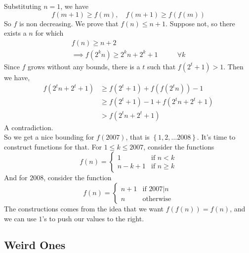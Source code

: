 \begin{solution}
    Substituting $n=1$, we have 
    \[f(m+1) \ge f(m), \quad f(m+1) \ge f(f(m))\]
    So $f$ is non decreasing. We prove that $f(n) \le n+1$. Suppose not, so
    there exists a $n$ for which
    \[\begin{aligned}
        f(n) \ge n+2&\\
        \implies f(2^kn) \ge 2^kn + 2^k +1& \qquad \forall k
    \end{aligned}\] 
    Since $f$ grows without any bounds, there is a $t$ such that $f(2^t+1)>1$.
    Then we have,
    \[\begin{aligned}
        f(2^tn+2^t+1) &\ge f(2^t+1) + f(f(2^tn)) -1\\
                      &\ge f(2^t+1)-1 +f(2^tn+2^t+1)\\
                      &> f(2^tn+2^t+1)
    \end{aligned}\]
    A contradiction.\\

    So we get a nice bounding for $f(2007)$, that is $\left\{1, 2, \dots
    2008\right\}$. It's time to construct functions for that. For $1\le k \le
    2007$, consider the functions
    \[f(n) = \begin{cases}
        1 & \text{if } n < k\\
        n-k+1 & \text{if } n\ge k
    \end{cases}\]
    And for $2008$, consider the function
    \[f(n) = \begin{cases}
        n+1 & \text{if } 2007|n\\
        n & \text{otherwise}
    \end{cases}\]
    The constructions comes from the idea that we want $f(f(n)) =f(n)$, and we
    can use $1$'s to push our values to the right.
\end{solution}


\newpage\subsection{Weird Ones}




